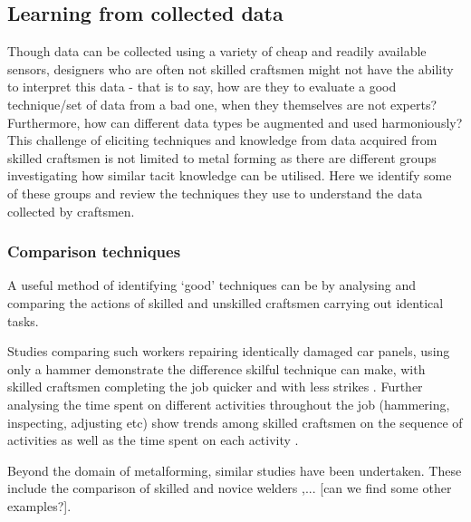 






\subsection{Learning from collected data}

Though data can be collected using a variety of cheap and readily available sensors, designers who are often not skilled craftsmen might not have the ability to interpret this data - that is to say, how are they to evaluate a good technique/set of data from a bad one, when they themselves are not experts? Furthermore, how can different data types be augmented and used harmoniously? This challenge of eliciting techniques and knowledge from data acquired from skilled craftsmen is not limited to metal forming as there are different groups investigating how similar tacit knowledge can be utilised. Here we identify some of these groups and review the techniques they use to understand the data collected by craftsmen.

\subsubsection{Comparison techniques}
A useful method of identifying `good' techniques can be by analysing and comparing the actions of skilled and unskilled craftsmen carrying out identical tasks. 

Studies comparing such workers repairing identically damaged car panels, using only a hammer demonstrate the difference skilful technique can make, with skilled craftsmen completing the job quicker and with less strikes \citep{Ikemoto2016}. Further analysing the time spent on different activities throughout the job (hammering, inspecting, adjusting etc) show trends among skilled craftsmen on the sequence of activities as well as the time spent on each activity \citep{Takai2020}. 

Beyond the domain of metalforming, similar studies have been undertaken. These include the comparison of skilled and novice welders \citep{Manorathna2017},... [can we find some other examples?].

